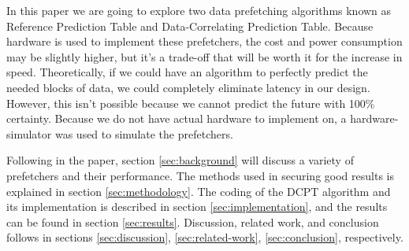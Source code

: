 In this paper we are going to explore two data prefetching algorithms known as Reference Prediction Table\cite{RPT} and Data-Correlating Prediction Table\cite{grannaes}. Because hardware is used to implement these prefetchers, the cost and power consumption may be slightly higher, but it's a trade-off that will be worth it for the increase in speed. Theoretically, if we could have an algorithm to perfectly predict the needed blocks of data, we could completely eliminate latency in our design. However, this isn't possible because we cannot predict the future with 100\% certainty. Because we do not have actual hardware to implement on, a hardware-simulator was used to simulate the prefetchers.

Following in the paper, section \ref{sec:background} will discuss a variety of prefetchers and their performance. The methods used in securing good results is explained in section \ref{sec:methodology}. The coding of the DCPT algorithm and its implementation is described in section \ref{sec:implementation}, and the results can be found in section \ref{sec:results}. Discussion, related work, and conclusion follows in sections \ref{sec:discussion}, \ref{sec:related-work}, \ref{sec:conclusion}, respectively.
